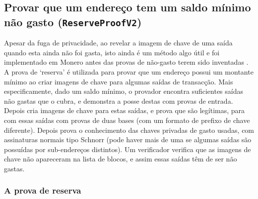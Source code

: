 \subsection{Provar que um endereço tem um saldo mínimo não gasto ({\tt ReserveProofV2})}
\label{subsec:proofs-minimum-balance-reserveproof}

Apesar da fuga de privacidade, ao revelar a imagem de chave de uma saída quando esta ainda não foi gasta, isto ainda é um método algo útil e foi implementado em Monero \cite{reserveproofs-pull-request-3027} antes das provas de não-gasto terem sido inventadas \cite{unspent-proof-issue-68}. A prova de `reserva' é utilizada para provar que um endereço possui um montante mínimo ao criar imagens de chave para algumas saídas de transacção. 
Mais especificamente, dado um saldo mínimo, o provador encontra suficientes saídas não gastas que o cubra, e demonstra a posse destas com provas de entrada. Depois cria imagens de chave para estas saídas, e prova que são legítimas, para com essas saídas com provas de duas bases (com um formato de prefixo de chave diferente). Depois prova o conhecimento das chaves privadas de gasto usadas, com assinaturas normais tipo Schnorr (pode haver mais de uma se algumas saídas são possuídas por sub-endereços distintos). Um verificador verifica que as imagens de chave não apareceram na lista de blocos, e assim essas saídas têm de ser não gastas. 
    

\subsubsection*{A prova de reserva}

